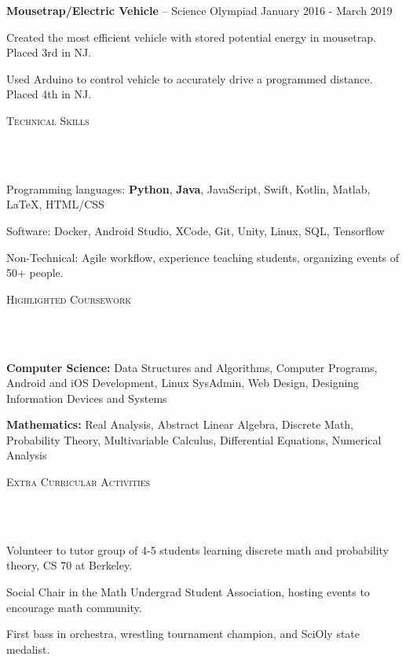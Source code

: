 \documentclass{article}
\newcommand{\header}[1]{{
\hspace*{-15pt}\vspace*{6pt} \textsc{#1}} \vspace*{-6pt} 
\lineunder
}
\newcommand{\lineunder}{
\vspace*{-8pt} \\ \hspace*{-18pt} 
\hrulefill \\
}
\newcommand{\project}[3]{{
\vspace*{2pt}%
\textbf{#1} #2 \hfill #3\vspace*{2pt}}
}
\renewcommand{\labelitemii}{
$\vcenter{\hbox{\tiny$\bullet$}}$\hspace*{-3pt}
}
\newenvironment{bullet-list-major}{
\begin{list}{\labelitemii}{\setlength\leftmargin{3pt} 
\topsep 0pt \itemsep -2pt}}{\vspace*{4pt}\end{list}
}
\newenvironment{bullet-list-minor}{
\begin{list}{\labelitemii}{\setlength\leftmargin{15pt} 
\topsep 0pt \itemsep -2pt}}{\vspace*{4pt}\end{list}
}
\begin{document}
    \project{Mousetrap/Electric Vehicle}{ -- Science Olympiad}{ January 2016 - March 2019}
    \begin{bullet-list-minor}
    \item Created the most efficient vehicle with stored potential energy in mousetrap. Placed 3rd in NJ. 
    \item Used Arduino to control vehicle to accurately drive a programmed distance. Placed 4th in NJ. 
    \end{bullet-list-minor}
	
\vspace*{4pt}%
\header{Technical Skills}
    \begin{bullet-list-major}
    \item Programming languages: \textbf{Python}, \textbf{Java}, JavaScript, Swift, Kotlin, Matlab, LaTeX, HTML/CSS
    \item Software: Docker, Android Studio, XCode, Git, Unity, Linux, SQL, Tensorflow 
    \item Non-Technical: Agile workflow, experience teaching students, organizing events of 50+ people.
    \end{bullet-list-major}

\vspace*{4pt}%
\header{Highlighted Coursework}
    \begin{bullet-list-major}
    \item \textbf{Computer Science:} Data Structures and Algorithms, Computer Programs, Android and iOS Development, Linux SysAdmin, Web Design, Designing Information Devices and Systems
    \item \textbf{Mathematics:} Real Analysis, Abstract Linear Algebra, Discrete Math, Probability Theory, Multivariable Calculus, Differential Equations, Numerical Analysis
    \end{bullet-list-major}

\vspace*{4pt}%
\header{Extra Curricular Activities}
    \begin{bullet-list-major}
    \item Volunteer to tutor group of 4-5 students learning discrete math and probability theory, CS 70 at Berkeley. 
    \item Social Chair in the Math Undergrad Student Association, hosting events to encourage math community.
    \item First bass in orchestra, wrestling tournament champion, and SciOly state medalist.
    \end{bullet-list-major}
\end{document}
